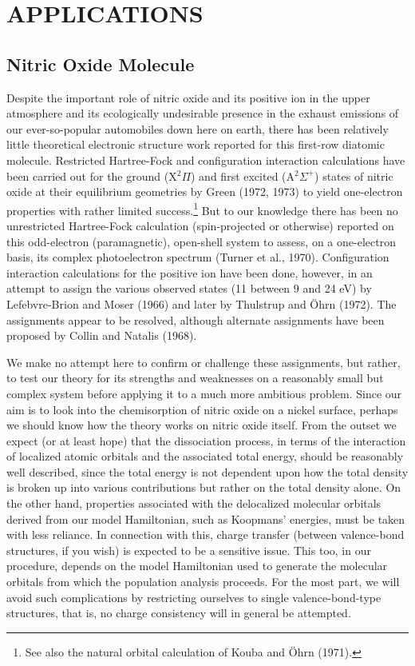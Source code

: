 \documentclass[12pt,letterpaper]{report}
\begin{document}
\chapter{APPLICATIONS}

\section{Nitric Oxide Molecule}

Despite the important role of nitric oxide and its positive ion in the upper atmosphere and its ecologically undesirable presence in the exhaust emissions of our ever-so-popular automobiles down here on earth, there has been relatively little theoretical electronic structure work reported for this first-row diatomic molecule. Restricted Hartree-Fock and configuration interaction calculations have been carried out for the ground (X$^2\Pi$) and first excited (A$^2\Sigma^+$) states of nitric oxide at their equilibrium geometries by Green (1972, 1973) to yield one-electron properties with rather limited success.\footnote{See also the natural orbital calculation of Kouba and Öhrn (1971).} But to our knowledge there has been no unrestricted Hartree-Fock calculation (spin-projected or otherwise) reported on this odd-electron (paramagnetic), open-shell system to assess, on a one-electron basis, its complex photoelectron spectrum (Turner et al., 1970). Configuration interaction calculations for the positive ion have been done, however, in an attempt to assign the various observed states (11 between 9 and 24 eV) by Lefebvre-Brion and Moser (1966) and later by Thulstrup and Öhrn (1972). The assignments appear to be resolved, although alternate assignments have been proposed by Collin and Natalis (1968).

We make no attempt here to confirm or challenge these assignments, but rather, to test our theory for its strengths and weaknesses on a reasonably small but complex system before applying it to a much more ambitious problem. Since our aim is to look into the chemisorption of nitric oxide on a nickel surface, perhaps we should know how the theory works on nitric oxide itself. From the outset we expect (or at least hope) that the dissociation process, in terms of the interaction of localized atomic orbitals and the associated total energy, should be reasonably well described, since the total energy is not dependent upon how the total density is broken up into various contributions but rather on the total density alone. On the other hand, properties associated with the delocalized molecular orbitals derived from our model Hamiltonian, such as Koopmans' energies, must be taken with less reliance. In connection with this, charge transfer (between valence-bond structures, if you wish) is expected to be a sensitive issue. This too, in our procedure, depends on the model Hamiltonian used to generate the molecular orbitals from which the population analysis proceeds. For the most part, we will avoid such complications by restricting ourselves to single valence-bond-type structures, that is, no charge consistency will in general be attempted.
\end{document}
